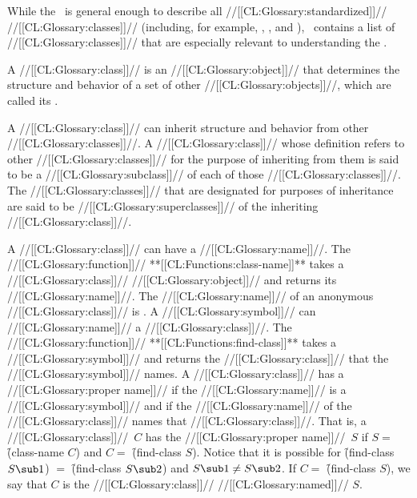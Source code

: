 


While the \CLOS\ is general enough to describe all //[[CL:Glossary:standardized]]// //[[CL:Glossary:classes]]//
(including, for example, , , and
), \thenextfigure\ contains a list of //[[CL:Glossary:classes]]// that are
especially relevant to understanding the \CLOS.



A //[[CL:Glossary:class]]// is an //[[CL:Glossary:object]]// that determines the structure and behavior 
of a set of other //[[CL:Glossary:objects]]//, which are called its .   

A //[[CL:Glossary:class]]// can inherit structure and behavior from other //[[CL:Glossary:classes]]//.
A //[[CL:Glossary:class]]// whose definition refers to other //[[CL:Glossary:classes]]// for the purpose 
of inheriting from them is said to be a //[[CL:Glossary:subclass]]// of each of
those //[[CL:Glossary:classes]]//. The //[[CL:Glossary:classes]]// that are designated for purposes of
inheritance are said to be //[[CL:Glossary:superclasses]]// of the inheriting //[[CL:Glossary:class]]//.
                                              
A //[[CL:Glossary:class]]// can have a //[[CL:Glossary:name]]//. The //[[CL:Glossary:function]]// **[[CL:Functions:class-name]]** 
takes a //[[CL:Glossary:class]]// //[[CL:Glossary:object]]// and returns its //[[CL:Glossary:name]]//. 
The //[[CL:Glossary:name]]// of an anonymous //[[CL:Glossary:class]]// is \nil.  A //[[CL:Glossary:symbol]]// 
can //[[CL:Glossary:name]]// a //[[CL:Glossary:class]]//. The //[[CL:Glossary:function]]// **[[CL:Functions:find-class]]** takes a
//[[CL:Glossary:symbol]]// and returns the //[[CL:Glossary:class]]// that the //[[CL:Glossary:symbol]]// names.
A //[[CL:Glossary:class]]// has a //[[CL:Glossary:proper name]]// if the //[[CL:Glossary:name]]// is a //[[CL:Glossary:symbol]]//
and if the //[[CL:Glossary:name]]// of the //[[CL:Glossary:class]]// names that //[[CL:Glossary:class]]//.
That is, a //[[CL:Glossary:class]]//~$C$ has the //[[CL:Glossary:proper name]]//~$S$ if $S=$
\f{(class-name $C$)} and $C=$ \f{(find-class $S$)}.
Notice that it is possible for 
\f{(find-class $S\sub 1$)} $=$ \f{(find-class $S\sub 2$)}
and $S\sub 1\neq S\sub 2$.
If $C=$ \f{(find-class $S$)}, we say that $C$ is the //[[CL:Glossary:class]]// //[[CL:Glossary:named]]// $S$.

